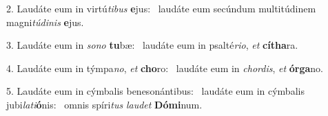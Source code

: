 2. Laudáte eum in virtú\textit{ti}\textit{bus} \textbf{e}jus: \ast\  laudáte eum secúndum multitúdinem magni\textit{tú}\textit{di}\textit{nis} \textbf{e}jus.\

3. Laudáte eum in \textit{so}\textit{no} \textbf{tu}bæ: \ast\  laudáte eum in psalté\textit{ri}\textit{o}, \textit{et} \textbf{cí}\textbf{tha}ra.\

4. Laudáte eum in týmpa\textit{no}, \textit{et} \textbf{cho}ro: \ast\  laudáte eum in \textit{chor}\textit{dis}, \textit{et} \textbf{ór}\textbf{ga}no.\

5. Laudáte eum in cýmbalis benesonántibus: \dag\  laudáte eum in cýmbalis jubi\textit{la}\textit{ti}\textbf{ó}nis: \ast\  omnis spíri\textit{tus} \textit{lau}\textit{det} \textbf{Dó}\textbf{mi}num.\

